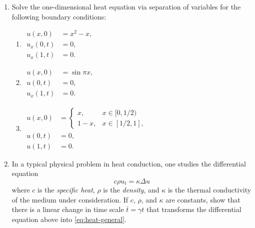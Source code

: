 \begin{enumerate}[label=\thesection.\arabic*.,ref=\thesection.\arabic*,start=21,series=book-problems]

\item\label{ex:heat-three-boundary-problems} Solve the one-dimensional heat equation via separation of variables for the following boundary conditions:\begin{enumerate}[label=(\alph*)]
\item $\begin{aligned}u(x,0)&=x^2-x,\\u_x(0,t)&=0,\\u_x(1,t)&=0.\end{aligned}$
\item $\begin{aligned}u(x,0)&=\sin\pi x,\\u(0,t)&=0,\\u_x(1,t)&=0.\end{aligned}$
\item $\begin{aligned}
u(x,0)&=\begin{cases}x,&x\in[0,1/2)\\1-x,&x\in[1/2,1],\end{cases}\\
u(0,t)&=0,\\u(1,t)&=0.
\end{aligned}$
\end{enumerate}

\item\label{ex:heat-physical-time-scaling} In a typical physical problem in heat conduction, one studies the differential equation
\[
c\rho u_t=\kappa\Delta u
\]
where $c$ is the \emph{specific heat}, $\rho$ is the \emph{density}, and $\kappa$ is the thermal conductivity of the medium under consideration. If $c$, $\rho$, and $\kappa$ are constants, show that there is a linear change in time scale $\bar t=\gamma t$ that transforms the differential equation above into \eqref{eq:heat-general}.


\end{enumerate}
